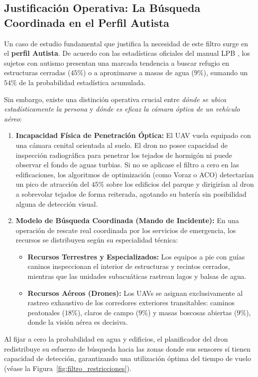 \subsection{Justificación Operativa: La Búsqueda Coordinada en el Perfil Autista}

Un caso de estudio fundamental que justifica la necesidad de este filtro surge en el \textbf{perfil Autista}. De acuerdo con las estadísticas oficiales del manual LPB \cite{koester2008lost, romero2018manual}, los sujetos con autismo presentan una marcada tendencia a buscar refugio en estructuras cerradas ($45\%$) o a aproximarse a masas de agua ($9\%$), sumando un $54\%$ de la probabilidad estadística acumulada.

Sin embargo, existe una distinción operativa crucial entre \textit{dónde se ubica estadísticamente la persona} y \textit{dónde es eficaz la cámara óptica de un vehículo aéreo}:
\begin{enumerate}
    \item \textbf{Incapacidad Física de Penetración Óptica:} El UAV vuela equipado con una cámara cenital orientada al suelo. El dron no posee capacidad de inspección radiográfica para penetrar los tejados de hormigón ni puede observar el fondo de aguas turbias. Si no se aplicase el filtro a cero en las edificaciones, los algoritmos de optimización (como Voraz o ACO) detectarían un pico de atracción del $45\%$ sobre los edificios del parque y dirigirían al dron a sobrevolar tejados de forma reiterada, agotando su batería sin posibilidad alguna de detección visual.
    \item \textbf{Modelo de Búsqueda Coordinada (Mando de Incidente):} En una operación de rescate real coordinada por los servicios de emergencia, los recursos se distribuyen según su especialidad técnica:
    \begin{itemize}
        \item \textbf{Recursos Terrestres y Especializados:} Los equipos a pie con guías caninos inspeccionan el interior de estructuras y recintos cerrados, mientras que las unidades subacuáticas rastrean lagos y balsas de agua.
        \item \textbf{Recursos Aéreos (Drones):} Los UAVs se asignan exclusivamente al rastreo exhaustivo de los corredores exteriores transitables: caminos peatonales ($18\%$), claros de campo ($9\%$) y masas boscosas abiertas ($9\%$), donde la visión aérea es decisiva.
    \end{itemize}
\end{enumerate}
Al fijar a cero la probabilidad en agua y edificios, el planificador del dron redistribuye su esfuerzo de búsqueda hacia las zonas donde sus sensores sí tienen capacidad de detección, garantizando una utilización óptima del tiempo de vuelo (véase la Figura~\ref{fig:filtro_restricciones}).

